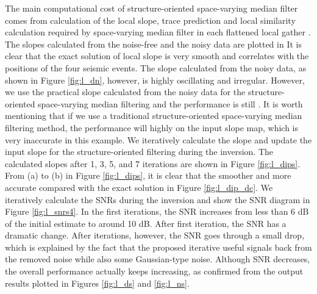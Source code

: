  The main computational cost of structure-oriented space-varying median filter comes from calculation of the local slope, trace prediction and local similarity calculation required by space-varying median filter in each flattened local gather \cite[]{sosvmf}.  The slopes calculated from the noise-free and the noisy data are plotted in  It is clear that the exact solution of  local slope is very smooth and correlates  with the positions of the four seismic events. The slope calculated from the noisy data, as shown in Figure \ref{fig:l_dn}, however, is highly oscillating and irregular. However, we use the practical slope calculated from the noisy data for the structure-oriented space-varying median filtering and the performance is still . It is worth mentioning that if we use a traditional structure-oriented space-varying median filtering method, the performance will highly  on the input slope map, which is very inaccurate in this example. We iteratively calculate the slope and update the input slope for the structure-oriented filtering during the inversion. The calculated slopes after 1, 3, 5, and 7 iterations are shown in Figure \ref{fig:l_dips}. From (a) to (b) in Figure \ref{fig:l_dips}, it is clear that the   smoother and more accurate  compared with the exact solution in Figure \ref{fig:l_dip_dc}.  We iteratively calculate the SNRs during the inversion and show the SNR diagram in Figure \ref{fig:l_snrs4}. In the first  iterations, the SNR increases from less than 6 dB of the initial estimate to around 10 dB. After  first iteration, the SNR has a dramatic change. After  iterations, however, the SNR goes through a small drop, which is explained by the fact that the proposed iterative  useful signals back from the removed noise while also some Gaussian-type noise. Although SNR decreases, the overall performance actually keeps increasing, as confirmed from the  output results plotted in Figures \ref{fig:l_ds} and \ref{fig:l_ns}.

